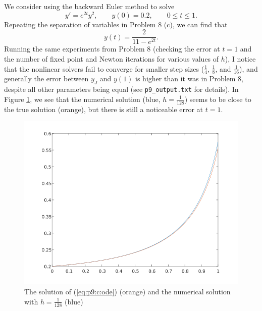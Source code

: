 \documentclass{homework}
\begin{document}
		\question 
		\begin{alphaparts}
			\questionpart We consider using the backward Euler method to solve
			\begin{equation}
				\label{eq:p9:c:ode}
				y' = e^{2t}y^2, \qquad y(0) = 0.2, \qquad 0\le t\le 1.
			\end{equation}
			Repeating the separation of variables in Problem 8 (c), we can find that
			\begin{equation}
				y(t) = \frac{2}{11 - e^{2t}}.
			\end{equation}
			Running the same experiments from Problem 8 (checking the error at $t = 1$ and the number of fixed point and Newton iterations for various values of $h$), I notice that the nonlinear solvers fail to converge for smaller step sizes ($\frac{1}{4}$, $\frac{1}{8}$, and $\frac{1}{16}$), and generally the error between $y_J$ and $y(1)$ is higher than it was in Problem 8, despite all other parameters being equal (see \verb*|p9_output.txt| for details). In Figure \ref{fig:p9c}, we see that the numerical solution (blue, $h=\frac{1}{128}$) seems to be close to the true solution (orange), but there is still a noticeable error at $t=1$.
			
			\begin{figure}[H]
				\centering
				\includegraphics[width={\linewidth}]{plot_p9c.png}
				\caption{The solution of (\ref{eq:p9:c:ode}) (orange) and the numerical solution with $h=\frac{1}{128}$ (blue)}
				\label{fig:p9c}
			\end{figure}
			

\end{alphaparts}
\end{document}
